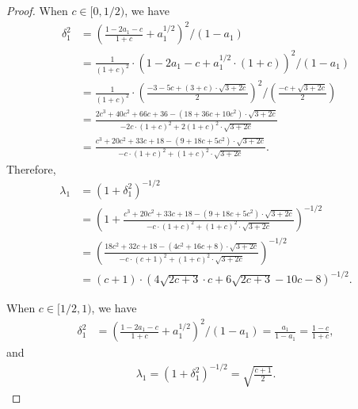 \begin{proof}
When $c\in[0,1/2)$, we have
\begin{align*}
  \delta_1^2&=\left(\frac{1-2a_1-c}{1+c}+a_1^{1/2}\right)^2/(1-a_1)\\
  &=\frac{1}{(1+c)^2}\cdot\left(1-2a_1-c+a_1^{1/2}\cdot(1+c)\right)^2/(1-a_1) \\
  &=\frac{1}{(1+c)^2}\cdot\left(\frac{-3-5c+(3+c)\cdot\sqrt{3+2c}}{2}\right)^2/\left(\frac{-c+\sqrt{3+2c}}{2}\right) \\
  &=\frac{2c^3+40c^2+66c+36-(18+36c+10c^2)\cdot\sqrt{3+2c}}{-2c\cdot(1+c)^2+2(1+c)^2\cdot\sqrt{3+2c}} \\
  &=\frac{c^3+20c^2+33c+18-(9+18c+5c^2)\cdot\sqrt{3+2c}}{-c\cdot(1+c)^2+(1+c)^2\cdot\sqrt{3+2c}}.
\end{align*}
Therefore,
\begin{align*}
  \lambda_1&=(1+\delta_1^2)^{-1/2}\\
  &=\left(1+\frac{c^3+20c^2+33c+18-(9+18c+5c^2)\cdot\sqrt{3+2c}}{-c\cdot(1+c)^2+(1+c)^2\cdot\sqrt{3+2c}}\right)^{-1/2}\\
  &=\left(\frac{18c^2+32c+18-(4c^2+16c+8)\cdot\sqrt{3+2c}}{-c\cdot(c+1)^2+(1+c)^2\cdot\sqrt{3+2c}}\right)^{-1/2}\\
  &=(c+1)\cdot\left(4\sqrt{2c+3}\cdot c+6\sqrt{2c+3}-10c-8\right)^{-1/2}.
\end{align*}

When $c\in[1/2,1)$, we have
\begin{align*}
  \delta_1^2&=\left(\frac{1-2a_1-c}{1+c}+a_1^{1/2}\right)^2/(1-a_1)
  =\frac{a_1}{1-a_1}
  =\frac{1-c}{1+c},
\end{align*}
and
\begin{align*}
  \lambda_1=\left(1+\delta_1^2\right)^{-1/2}=\sqrt{\frac{c+1}{2}}.
\end{align*}
\end{proof}

